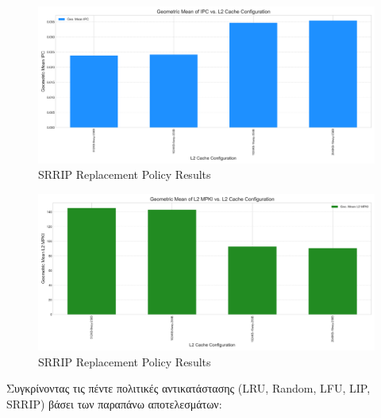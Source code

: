 \documentclass{article}
\begin{document}
\begin{figure}[H]
    \centering
    \includegraphics[width=\textwidth]{figures/srrip/ipc_srrip.png}
    \caption{SRRIP Replacement Policy Results}
    \label{fig:srrip_ipc}
\end{figure}

\begin{figure}[H]
    \centering
    \includegraphics[width=\textwidth]{figures/srrip/mpki_srrip.png}
    \caption{SRRIP Replacement Policy Results}
    \label{fig:srrip_mpki}
\end{figure}

Συγκρίνοντας τις πέντε πολιτικές αντικατάστασης (LRU, Random, LFU, LIP, SRRIP) βάσει των παραπάνω αποτελεσμάτων:
\end{document}
